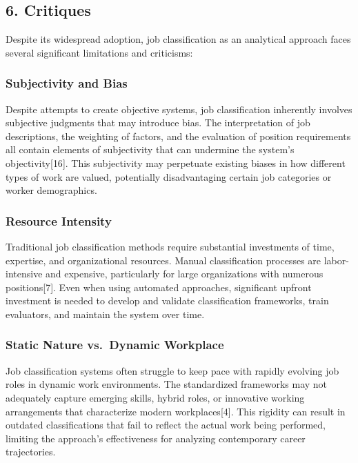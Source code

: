 \documentclass[
  letterpaper,
  DIV=11,
  numbers=noendperiod]{scrartcl}
\begin{document}
\subsection{6. Critiques}\label{critiques}

Despite its widespread adoption, job classification as an analytical
approach faces several significant limitations and criticisms:

\subsubsection{Subjectivity and Bias}\label{subjectivity-and-bias}

Despite attempts to create objective systems, job classification
inherently involves subjective judgments that may introduce bias. The
interpretation of job descriptions, the weighting of factors, and the
evaluation of position requirements all contain elements of subjectivity
that can undermine the system's objectivity{[}16{]}. This subjectivity
may perpetuate existing biases in how different types of work are
valued, potentially disadvantaging certain job categories or worker
demographics.

\subsubsection{Resource Intensity}\label{resource-intensity}

Traditional job classification methods require substantial investments
of time, expertise, and organizational resources. Manual classification
processes are labor-intensive and expensive, particularly for large
organizations with numerous positions{[}7{]}. Even when using automated
approaches, significant upfront investment is needed to develop and
validate classification frameworks, train evaluators, and maintain the
system over time.

\subsubsection{Static Nature vs.~Dynamic
Workplace}\label{static-nature-vs.-dynamic-workplace}

Job classification systems often struggle to keep pace with rapidly
evolving job roles in dynamic work environments. The standardized
frameworks may not adequately capture emerging skills, hybrid roles, or
innovative working arrangements that characterize modern
workplaces{[}4{]}. This rigidity can result in outdated classifications
that fail to reflect the actual work being performed, limiting the
approach's effectiveness for analyzing contemporary career trajectories.
\end{document}
